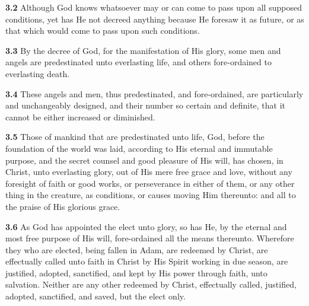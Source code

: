 \par\textbf{3.2} Although God knows whatsoever may or can come to pass upon all supposed conditions, yet has He not decreed anything because He foresaw it as future, or as that which would come to pass upon such conditions.   
\par\textbf{3.3} By the decree of God, for the manifestation of His glory, some men and angels are predestinated unto everlasting life, and others fore-ordained to everlasting death.   
\par\textbf{3.4} These angels and men, thus predestinated, and fore-ordained, are particularly and unchangeably designed, and their number so certain and definite, that it cannot be either increased or diminished.   
\par\textbf{3.5} Those of mankind that are predestinated unto life, God, before the foundation of the world was laid, according to His eternal and immutable purpose, and the secret counsel and good pleasure of His will, has chosen, in Christ, unto everlasting glory, out of His mere free grace and love, without any foresight of faith or good works, or perseverance in either of them, or any other thing in the creature, as conditions, or causes moving Him thereunto: and all to the praise of His glorious grace.   

\par\textbf{3.6} As God has appointed the elect unto glory, so has He, by the eternal and most free purpose of His will, fore-ordained all the means thereunto. Wherefore they who are elected, being fallen in Adam, are redeemed by Christ, are effectually called unto faith in Christ by His Spirit working in due season, are justified, adopted, sanctified, and kept by His power through faith, unto salvation. Neither are any other redeemed by Christ, effectually called, justified, adopted, sanctified, and saved, but the elect only.   

